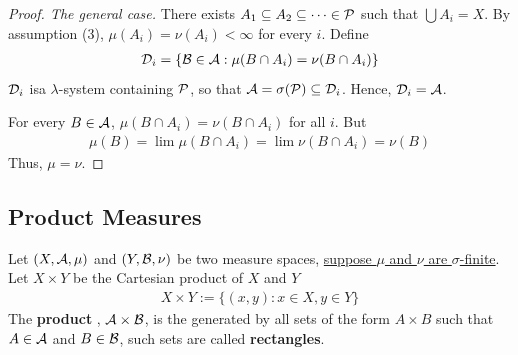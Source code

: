 \documentclass[11pt]{article}
\begin{document}
	\begin{proof}[Proof. The general case]
		There exists $A_1 \subseteq A_2 \subseteq \dots \in \mathcal{{P}}$ such that $\bigcup A_i = X$.
		By assumption (3), $\mu(A_i) = \nu(A_i) < \infty$ for every $i$.
		Define
		\begin{align}
			\mathcal{{D}}_i = \{\mathcal{{B}} \in \mathcal{{A}} : \mu(B \cap A_i) = \nu(B \cap A_i)\}
		\end{align}
		$\mathcal{{D}}_i$ isa $\lambda$-system containing $\mathcal{{P}}$, so that $\mathcal{{A}} = \sigma(\mathcal{{P}}) \subseteq \mathcal{{D}}_i$. Hence, $\mathcal{{D}}_i = \mathcal{{A}}$.
		
		For every $B \in \mathcal{{A}}$, $\mu(B \cap A_i) = \nu(B \cap A_i)$ for all $i$. But
		\begin{align}
			\mu(B) = \lim \mu(B \cap A_i) = \lim \nu(B \cap A_i) = \nu(B)
		\end{align}
		Thus, $\mu = \nu$.
	\end{proof}
	
	\subsection{Product Measures}
	\begin{definition}
		Let $(X, \mathcal{{A}}, \mu)$ and $(Y, \mathcal{{B}}, \nu)$ be two measure spaces, \ul{suppose $\mu$ and $\nu$ are $\sigma$-finite}.
		Let $X \times Y$ be the Cartesian product of $X$ and $Y$
		\begin{align}
			X \times Y := \{(x, y) : x \in X, y \in Y\}
		\end{align}
		The \textbf{product \salg}, $\mathcal{{A}} \times \mathcal{{B}}$, is the \salg generated by all sets of the form $A \times B$ such that $A \in \mathcal{{A}}$ and $B \in \mathcal{{B}}$, such sets are called \textbf{rectangles}.
	\end{definition}
	
\end{document}
